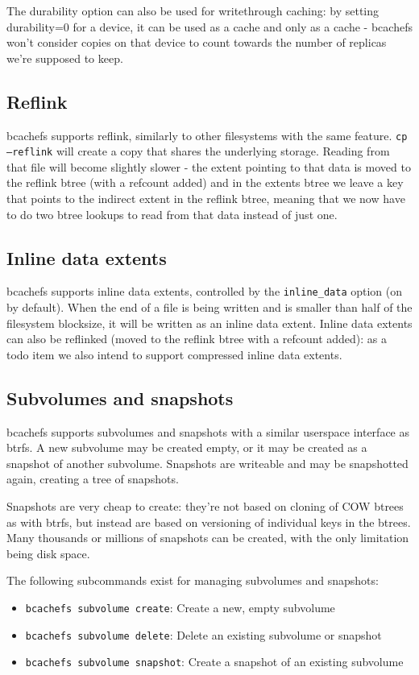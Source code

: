 \documentclass{article}
\begin{document}
The durability option can also be used for writethrough caching: by setting
durability=0 for a device, it can be used as a cache and only as a cache -
bcachefs won't consider copies on that device to count towards the number of
replicas we're supposed to keep.

\subsection{Reflink}

bcachefs supports reflink, similarly to other filesystems with the same feature.
\texttt{cp --reflink} will create a copy that shares the underlying storage.
Reading from that file will become slightly slower - the extent pointing to that
data is moved to the reflink btree (with a refcount added) and in the extents
btree we leave a key that points to the indirect extent in the reflink btree,
meaning that we now have to do two btree lookups to read from that data instead
of just one.

\subsection{Inline data extents}

bcachefs supports inline data extents, controlled by the \texttt{inline\_data}
option (on by default). When the end of a file is being written and is smaller
than half of the filesystem blocksize, it will be written as an inline data
extent. Inline data extents can also be reflinked (moved to the reflink btree
with a refcount added): as a todo item we also intend to support compressed
inline data extents.

\subsection{Subvolumes and snapshots}

bcachefs supports subvolumes and snapshots with a similar userspace interface as
btrfs. A new subvolume may be created empty, or it may be created as a snapshot
of another subvolume. Snapshots are writeable and may be snapshotted again,
creating a tree of snapshots.

Snapshots are very cheap to create: they're not based on cloning of COW btrees
as with btrfs, but instead are based on versioning of individual keys in the
btrees. Many thousands or millions of snapshots can be created, with the only
limitation being disk space.

The following subcommands exist for managing subvolumes and snapshots:
\begin{itemize}
	\item \texttt{bcachefs subvolume create}: Create a new, empty subvolume
	\item \texttt{bcachefs subvolume delete}: Delete an existing subvolume
		or snapshot
	\item \texttt{bcachefs subvolume snapshot}: Create a snapshot of an
		existing subvolume
\end{itemize}
\end{document}
